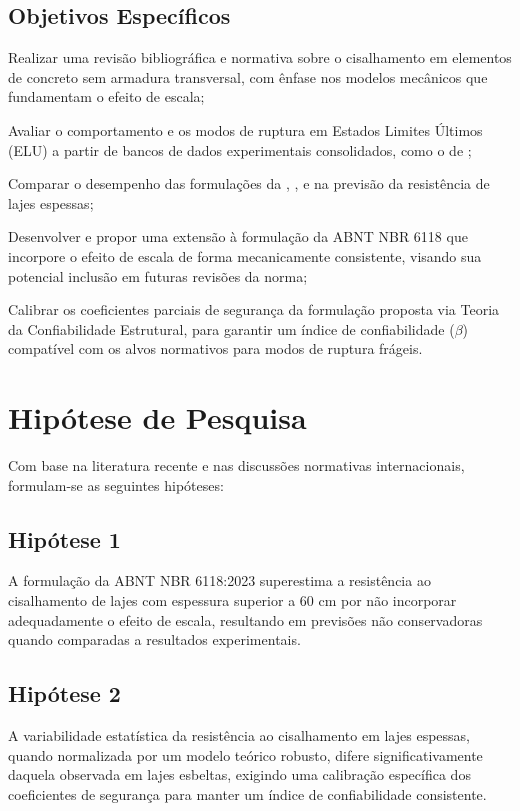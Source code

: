 \section{Objetivos Específicos}
\begin{alineas}
    \item Realizar uma revisão bibliográfica e normativa sobre o cisalhamento em elementos de concreto sem armadura transversal, com ênfase nos modelos mecânicos que fundamentam o efeito de escala;
    \item Avaliar o comportamento e os modos de ruptura em Estados Limites Últimos (ELU) a partir de bancos de dados experimentais consolidados, como o de \textcite{Kuchma2019};
    \item Comparar o desempenho das formulações da \textcite{NBR6118:2023}, \textcite{CEN2004}, \textcite{ACI318:2019} e \textcite{FIB:2020} na previsão da resistência de lajes espessas;
    \item Desenvolver e propor uma extensão à formulação da ABNT NBR 6118 que incorpore o efeito de escala de forma mecanicamente consistente, visando sua potencial inclusão em futuras revisões da norma;
    \item Calibrar os coeficientes parciais de segurança da formulação proposta via Teoria da Confiabilidade Estrutural, para garantir um índice de confiabilidade ($\beta$) compatível com os alvos normativos para modos de ruptura frágeis.
\end{alineas}

\chapter{Hipótese de Pesquisa}
Com base na literatura recente e nas discussões normativas internacionais, formulam-se as seguintes hipóteses:

\section{Hipótese 1}
A formulação da ABNT NBR 6118:2023 superestima a resistência ao cisalhamento de lajes com espessura superior a 60 cm por não incorporar adequadamente o efeito de escala, resultando em previsões não conservadoras quando comparadas a resultados experimentais.
\section{Hipótese 2}
A variabilidade estatística da resistência ao cisalhamento em lajes espessas, quando normalizada por um modelo teórico robusto, difere significativamente daquela observada em lajes esbeltas, exigindo uma calibração específica dos coeficientes de segurança para manter um índice de confiabilidade consistente.
